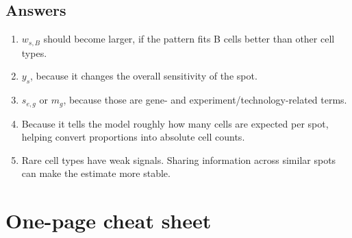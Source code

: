 \documentclass[11pt]{article}
\begin{document}
\subsection*{Answers}

\begin{enumerate}
  \item $w_{s,B}$ should become larger, if the pattern fits B cells better than other cell types.
  \item $y_s$, because it changes the overall sensitivity of the spot.
  \item $s_{e,g}$ or $m_g$, because those are gene- and experiment/technology-related terms.
  \item Because it tells the model roughly how many cells are expected per spot, helping convert proportions into absolute cell counts.
  \item Rare cell types have weak signals. Sharing information across similar spots can make the estimate more stable.
\end{enumerate}

\section{One-page cheat sheet}
\end{document}
